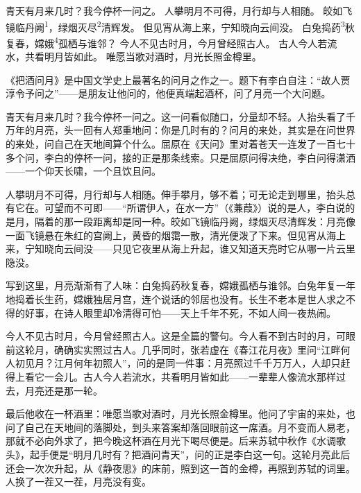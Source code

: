 
\begin{poem}
青天有月来几时？我今停杯一问之。
人攀明月不可得，月行却与人相随。
皎如飞镜临丹阙\textsuperscript{1}，绿烟灭尽\textsuperscript{2}清辉发。
但见宵从海上来，宁知晓向云间没。
白兔捣药\textsuperscript{3}秋复春，嫦娥\textsuperscript{4}孤栖与谁邻？
今人不见古时月，今月曾经照古人。
古人今人若流水，共看明月皆如此。
唯愿当歌对酒时，月光长照金樽里。
\end{poem}

\begin{annotations}
\end{annotations}

\begin{appreciation}
《把酒问月》是中国文学史上最著名的问月之作之一。题下有李白自注：“故人贾淳令予问之”——是朋友让他问的，他便真端起酒杯，问了月亮一个大问题。

青天有月来几时？我今停杯一问之。这一问看似随口，分量却不轻。人抬头看了千万年的月亮，头一回有人郑重地问：你是几时有的？问月的来处，其实是在问世界的来处，问自己在天地间算个什么。屈原在《天问》里对着苍天一连发了一百七十多个问，李白的停杯一问，接的正是那条线索。只是屈原问得决绝，李白问得潇洒——一个仰天长啸，一个且饮且问。

人攀明月不可得，月行却与人相随。伸手攀月，够不着；可无论走到哪里，抬头总有它在。可望而不可即——“所谓伊人，在水一方”（《蒹葭》）说的是人，李白说的是月，隔着的那一段距离却是同一种。皎如飞镜临丹阙，绿烟灭尽清辉发：月亮像一面飞镜悬在朱红的宫阙上，黄昏的烟霭一散，清光便泼了下来。但见宵从海上来，宁知晓向云间没——只见它夜里从海上升起，谁又知道天亮时它从哪一片云里隐没。

写到这里，月亮渐渐有了人味：白兔捣药秋复春，嫦娥孤栖与谁邻。白兔年复一年地捣着长生药，嫦娥独居月宫，连个说话的邻居也没有。长生不老本是世人求之不得的好事，在诗人眼里却冷清得可怕——天上千年不死，不如人间一夜热闹。

今人不见古时月，今月曾经照古人。这是全篇的警句。今人看不到古时的月，可眼前这轮月，确确实实照过古人。几乎同时，张若虚在《春江花月夜》里问“江畔何人初见月？江月何年初照人”，问的是同一件事：月亮照过千千万万人，人却只赶得上看它一会儿。古人今人若流水，共看明月皆如此——一辈辈人像流水那样过去，月亮还是那一轮。

最后他收在一杯酒里：唯愿当歌对酒时，月光长照金樽里。他问了宇宙的来处，也问了自己在天地间的落脚处，到头来答案却落回眼前这一席酒。月不变而人易老，那就不必向外求了，把今晚这杯酒在月光下喝尽便是。后来苏轼中秋作《水调歌头》，起手便是“明月几时有？把酒问青天”，问的正是李白这一句。这轮月亮此后还会一次次升起，从《静夜思》的床前，照到这一首的金樽，再照到苏轼的词里。人换了一茬又一茬，月亮没有变。
\end{appreciation}
